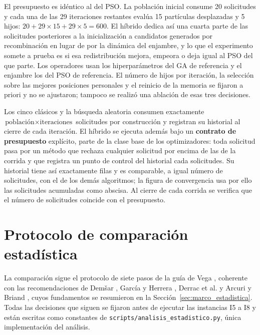 El presupuesto es idéntico al del PSO. La población inicial consume 20 solicitudes y cada una de las 29 iteraciones restantes evalúa 15 partículas desplazadas y 5 hijos: $20+29\times15+29\times5=600$. El híbrido dedica así una cuarta parte de las solicitudes posteriores a la inicialización a candidatos generados por recombinación en lugar de por la dinámica del enjambre, y lo que el experimento somete a prueba es si esa redistribución mejora, empeora o deja igual al PSO del que parte. Los operadores usan los hiperparámetros del GA de referencia y el enjambre los del PSO de referencia. El número de hijos por iteración, la selección sobre las mejores posiciones personales y el reinicio de la memoria se fijaron a priori y no se ajustaron; tampoco se realizó una ablación de esas tres decisiones.

Los cinco clásicos y la búsqueda aleatoria consumen exactamente $\text{población}\times\text{iteraciones}$ solicitudes por construcción y registran su historial al cierre de cada iteración. El híbrido se ejecuta además bajo un \textbf{contrato de presupuesto} explícito, parte de la clase base de los optimizadores: toda solicitud pasa por un método que rechaza cualquier solicitud por encima de las \RequestsPerRun{} de la corrida y que registra un punto de control del historial cada \Population{} solicitudes. Su historial tiene así exactamente \Iterations{} filas y es comparable, a igual número de solicitudes, con el de los demás algoritmos; la figura de convergencia usa por ello las solicitudes acumuladas como abscisa. Al cierre de cada corrida se verifica que el número de solicitudes coincide con el presupuesto.

\section{Protocolo de comparación estadística}
\label{sec:protocolo_estadistico}

La comparación sigue el protocolo de siete pasos de la guía de Vega \cite{VegaGuiaEstadistica}, coherente con las recomendaciones de Demšar \cite{Demsar2006Statistical}, García y Herrera \cite{Garcia2008Extension}, Derrac et al. \cite{Derrac2011Tutorial} y Arcuri y Briand \cite{Arcuri2014Hitchhiker}, cuyos fundamentos se resumieron en la Sección~\ref{sec:marco_estadistica}. Todas las decisiones que siguen se fijaron antes de ejecutar las instancias I5 a I8 y están escritas como constantes de \texttt{scripts/analisis\_estadistico.py}, única implementación del análisis.

